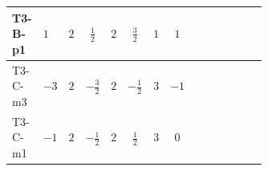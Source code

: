 \documentclass[8pt]{article}
\begin{document}
\begin{landscape}
\begin{longtable}{@{}llcccccc >{\raggedright\arraybackslash}p{0.21\linewidth} >{\raggedright\arraybackslash}p{0.21\linewidth} >{\raggedright\arraybackslash}p{0.21\linewidth}@{}}
T3-B-p1 & $1$ & $2$ & $\frac{1}{2}$ & $2$ & $\frac{3}{2}$ & $1$ & $1$ & \scriptsize\adjustbox{max width=\linewidth}{$\begin{gathered} +\frac{3}{2} (\left({Y_d}\,\left({Y_d}\right)^{\dagger}\,{Y_d}\right)_{ij}-\left({Y_u}\,\left({Y_u}\right)^{\dagger}\,{Y_d}\right)_{ij})\end{gathered}$} & \scriptsize\adjustbox{max width=\linewidth}{$\begin{gathered} -\frac{9}{4} {g_2}^2 \left({Y_d}\right)_{ij}\end{gathered}$} & \scriptsize\adjustbox{max width=\linewidth}{$\begin{gathered} -8 {g_3}^2 \left({Y_d}\right)_{ij}\end{gathered}$} \\
\midrule
T3-C-m3 & $-3$ & $2$ & $-\frac{3}{2}$ & $2$ & $-\frac{1}{2}$ & $3$ & $-1$ & \scriptsize\adjustbox{max width=\linewidth}{$\begin{gathered} +\frac{3}{2} (\left({Y_d}\,\left({Y_d}\right)^{\dagger}\,{Y_d}\right)_{ij}-\left({Y_u}\,\left({Y_u}\right)^{\dagger}\,{Y_d}\right)_{ij})\end{gathered}$} & \scriptsize\adjustbox{max width=\linewidth}{$\begin{gathered} -\frac{9}{4} {g_2}^2 \left({Y_d}\right)_{ij}\end{gathered}$} & \scriptsize\adjustbox{max width=\linewidth}{$\begin{gathered} -8 {g_3}^2 \left({Y_d}\right)_{ij}\end{gathered}$} \\
\midrule
T3-C-m1 & $-1$ & $2$ & $-\frac{1}{2}$ & $2$ & $\frac{1}{2}$ & $3$ & $0$ & \scriptsize\adjustbox{max width=\linewidth}{$\begin{gathered} +\frac{3}{2} (\left({Y_d}\,\left({Y_d}\right)^{\dagger}\,{Y_d}\right)_{ij}-\left({Y_u}\,\left({Y_u}\right)^{\dagger}\,{Y_d}\right)_{ij})\end{gathered}$} & \scriptsize\adjustbox{max width=\linewidth}{$\begin{gathered} -\frac{9}{4} {g_2}^2 \left({Y_d}\right)_{ij}\end{gathered}$} & \scriptsize\adjustbox{max width=\linewidth}{$\begin{gathered} -8 {g_3}^2 \left({Y_d}\right)_{ij}\end{gathered}$} \\
\midrule

\end{longtable}
\end{landscape}
\end{document}
